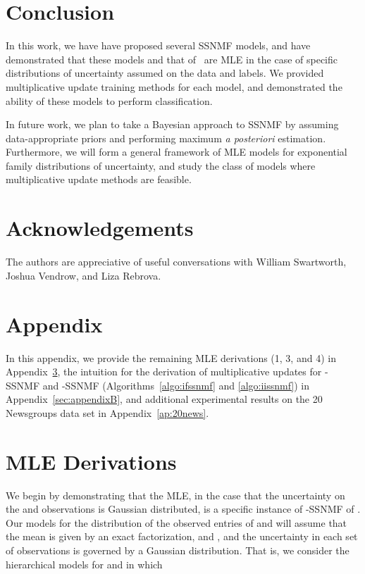 \documentclass[twocolumn,10pt]{article}
\begin{document}
\section{Conclusion} \label{sec:conclusion}

In this work, we have have proposed several SSNMF models, and have demonstrated that these models and that of~\cite{lee2009semi} are MLE in the case of specific distributions of uncertainty assumed on the data and labels.  We provided multiplicative update training methods for each model, and demonstrated the ability of these models to perform classification.

In future work, we plan to take a Bayesian approach to SSNMF by assuming data-appropriate priors and performing maximum \emph{a posteriori} estimation.  Furthermore, we will form a general framework of MLE models for exponential family distributions of uncertainty, and study the class of models where multiplicative update methods are feasible.



\section*{Acknowledgements}
The authors are appreciative of useful conversations with William Swartworth, Joshua Vendrow, and Liza Rebrova.  





\newpage
\section{Appendix}
\appendix
In this appendix, we provide the remaining MLE derivations (1, 3, and 4) in Appendix~\ref{sec:appendixA}, the intuition for the derivation of multiplicative updates for -SSNMF and -SSNMF (Algorithms~\ref{algo:ifssnmf} and \ref{algo:iissnmf}) in Appendix~\ref{sec:appendixB}, and additional experimental results on the 20 Newsgroups data set in Appendix~\ref{ap:20news}.

\section{MLE Derivations}\label{sec:appendixA}
We begin by demonstrating that the MLE, in the case that the uncertainty on the  and  observations is Gaussian distributed, is a specific instance of -SSNMF of \cite{lee2009semi}. 
Our models for the distribution of the observed entries of  and  will assume that the mean is given by an exact factorization,  and , and the uncertainty in each set of observations is governed by a Gaussian distribution.  
That is, we consider the hierarchical models for  and  in which 
\vspace{-1.5mm}
 
\end{document}
